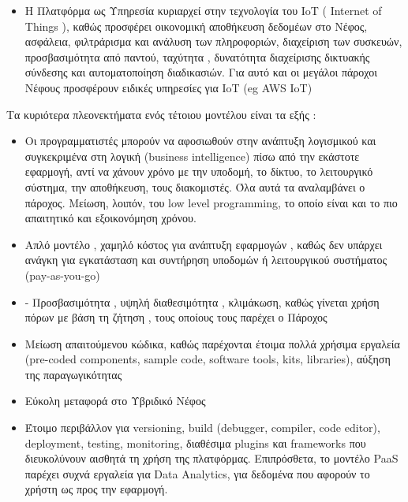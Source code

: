 \documentclass{article}
\begin{document}
\begin{itemize}
\item Η Πλατφόρμα ως Υπηρεσία κυριαρχεί στην τεχνολογία του IoT ( Internet of Things ), καθώς προσφέρει οικονομική αποθήκευση δεδομέων στο Νέφος, ασφάλεια, φιλτράρισμα και ανάλυση των πληροφοριών, διαχείριση των συσκευών, προσβασιμότητα από παντού, ταχύτητα , δυνατότητα διαχείρισης δικτυακής σύνδεσης και αυτοματοποίηση διαδικασιών. Για αυτό και οι μεγάλοι πάροχοι Νέφους προσφέρουν ειδικές υπηρεσίες για IoT (eg AWS IoT)
\end{itemize}
Τα κυριότερα πλεονεκτήματα ενός τέτοιου μοντέλου είναι τα εξής :
\begin{itemize}
\item Οι προγραμματιστές μπορούν να αφοσιωθούν στην ανάπτυξη λογισμικού και συγκεκριμένα στη λογική (business intelligence) πίσω από την εκάστοτε εφαρμογή, αντί να χάνουν χρόνο με την υποδομή, το δίκτυο, το λειτουργικό σύστημα, την αποθήκευση, τους διακομιστές. Όλα αυτά τα αναλαμβάνει ο πάροχος. Μείωση, λοιπόν, του low level  programming, το οποίο είναι και το πιο απαιτητικό και εξοικονόμηση χρόνου.
\item Απλό μοντέλο , χαμηλό κόστος για ανάπτυξη εφαρμογών , καθώς δεν υπάρχει ανάγκη για εγκατάσταση και συντήρηση υποδομών ή λειτουργικού συστήματος  (pay-as-you-go)
\item-	Προσβασιμότητα , υψηλή διαθεσιμότητα , κλιμάκωση, καθώς γίνεται χρήση πόρων με βάση τη ζήτηση , τους οποίους τους παρέχει ο Πάροχος
\item Μείωση απαιτούμενου κώδικα, καθώς παρέχονται έτοιμα πολλά χρήσιμα εργαλεία (pre-coded components, sample code, software tools, kits, libraries), αύξηση της παραγωγικότητας 
\item Εύκολη μεταφορά στο Υβριδικό Νέφος
\item Έτοιμο περιβάλλον για versioning, build (debugger, compiler, code editor), deployment, testing, monitoring, διαθέσιμα plugins και frameworks που διευκολύνουν αισθητά τη χρήση της πλατφόρμας. Επιπρόσθετα,  το μοντέλο PaaS παρέχει συχνά εργαλεία για Data Analytics, για δεδομένα που αφορούν το χρήστη ως προς την εφαρμογή.

\end{itemize}
\end{document}

